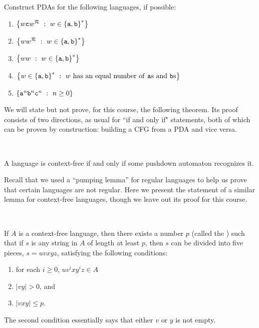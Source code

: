 \documentclass[twoside,letterpaper,openany]{book}
\begin{document}
\begin{exer1}
Construct PDAs for the following languages, if possible:
\begin{enumerate}
\item $\left\lbrace w\texttt{c}w^{\mathcal{R}}\ :\  w \in \left\lbrace \texttt{a}, \texttt{b} \right\rbrace^{*}  \right\rbrace$
\item $\left\lbrace ww^{\mathcal{R}}\ :\  w \in \left\lbrace \texttt{a}, \texttt{b} \right\rbrace^{*}  \right\rbrace$
\item $\left\lbrace w{w}\ :\  w \in \left\lbrace \texttt{a}, \texttt{b} \right\rbrace^{*}  \right\rbrace$
\item $\left\lbrace w \in \left\lbrace {\texttt{a}}, {\texttt{b}} \right\rbrace^{*}\ :\ w~\textrm{has an equal number of {\texttt{a}}{s} and {\texttt{b}}{s}} \right\rbrace$
\item $\left\lbrace \texttt{a}^n \texttt{b}^n \texttt{c}^n\ :\  n \geq 0  \right\rbrace$
\end{enumerate}
\end{exer1}

\begin{discussion}
We will state but not prove, for this course, the following theorem. Its proof consists of two directions, as usual for ``if and only if" statements, both of which can be proven by construction: building a CFG from a PDA and vice versa.
\end{discussion}

~

\begin{axiom}
A language is context-free if and only if some pushdown automaton recognizes it.
\end{axiom}

\begin{discussion}
Recall that we used a ``pumping lemma'' for regular languages to help us prove that certain languages are not regular. Here we present the statement of a similar lemma for context-free languages, though we leave out its proof for this course.
\end{discussion}

~

\begin{axiom}
If $A$ is a context-free language, then there exists a number $p$ (called the ) such that if $s$ is any string in $A$ of length at least $p$, then $s$ can be divided into five pieces, $s = uvxyz$, satisfying the following conditions:
\begin{enumerate}
\item for each $i \geq 0$, $uv^ixy^iz \in A$
\item $|vy| > 0$, and
\item $|vxy| \leq p$.
\end{enumerate}
The second condition essentially says that either $v$ or $y$ is not empty.
\end{axiom}
\end{document}
